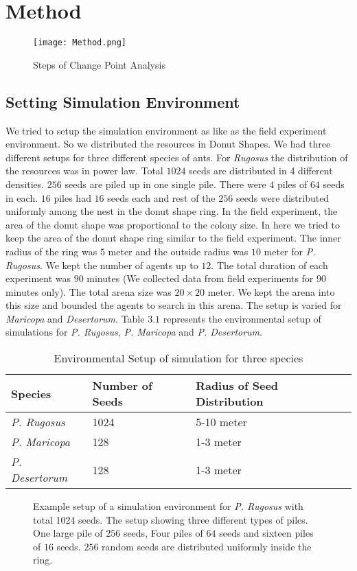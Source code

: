 \chapter{Method}
\begin{figure}[h]
	\texttt{[image: Method.png]}
	\caption{Steps of Change Point Analysis}
\end{figure}
\section{\label{section:Setting Simulation Environment}Setting Simulation Environment}
We tried to setup the simulation environment as like as the field experiment environment. So we distributed the resources in Donut Shapes. We had three different setups for three different species of ants. For \textit{Rugosus} the distribution of the resources was in power law. Total $1024$ seeds are distributed in 4 different densities. $256$ seeds are piled up in one single pile. There were $4$ piles of $64$ seeds in each. $16$ piles had $16$ seeds each and rest of the $256$ seeds were distributed uniformly among the nest in the donut shape ring. In the field experiment, the area of the donut shape was proportional to the colony size. In here we tried to keep the area of the donut shape ring similar to the field experiment. The inner radius of the ring was $5$ meter and the outside radius was $10$ meter for \textit{P. Rugosus}. We kept the number of agents up to $12$. The total duration of each experiment was $90$ minutes (We collected data from field experiments for $90$ minutes only). The total arena size was $20\times20$ meter. We kept the arena into this size and bounded the agents to search in this arena.  The setup is varied for \textit{Maricopa} and \textit{Desertorum}. Table $3.1$ represents the environmental setup of simulations for \textit{P. Rugosus}, \textit{P. Maricopa} and \textit{P. Desertorum}.
\begin{table}[h]
	\begin{tabular}{ |p{}|p{}|p{}| } 
		\hline
		\textbf{Species} & \textbf{Number of Seeds} & \textbf{Radius of Seed Distribution} \\
		\hline 
		\textit{P. Rugosus} & 1024 & 5-10 meter\\ 
		\hline
		\textit{P. Maricopa} & 128 & 1-3 meter\\ 
		\hline
		 \textit{P. Desertorum} & 128 & 1-3 meter\\
		\hline
	\end{tabular}
	\caption{Environmental Setup of simulation for three species}
\end{table}
\begin{figure}[!h]
	\caption{Example setup of a simulation environment for \textit{P. Rugosus} with total 1024 seeds. The setup showing three different types of piles. One large pile of $256$ seeds, Four piles of $64$ seeds and sixteen piles of $16$ seeds. $256$ random seeds are distributed uniformly inside the ring. }
\end{figure}

